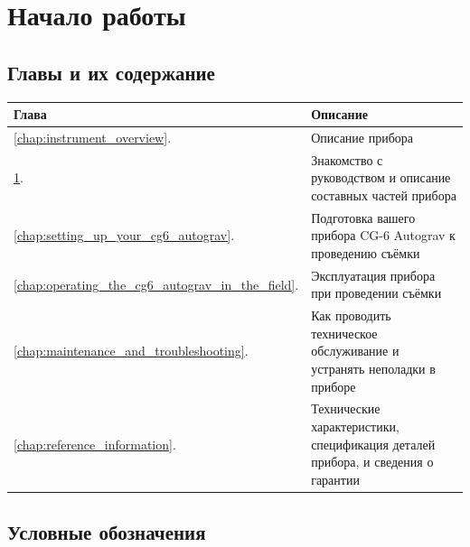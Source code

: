 \chapter[Начало работы]{Начало работы}
\label{chap:getting_started}

\section{Главы и их содержание}

\begin{table}[h]
  \begin{tabulary}{\textwidth}{|L|L|}
    \hline
    Глава & Описание \\
    \hline
    \ref{chap:instrument_overview}.  & Описание прибора \\
    \hline
    \ref{chap:getting_started}.  & Знакомство с
    руководством и описание составных частей прибора \\
    \hline
    \ref{chap:setting_up_your_cg6_autograv}.
     & Подготовка вашего прибора CG-6
    Autograv\texttrademark{} к проведению съёмки \\
    \hline
    \ref{chap:operating_the_cg6_autograv_in_the_field}.
     & Эксплуатация
    прибора \cg{} при проведении съёмки \\
    \hline
    \ref{chap:maintenance_and_troubleshooting}.
    & Как проводить техническое
    обслуживание и устранять неполадки в приборе \cg{} \\
    \hline
    \ref{chap:reference_information}.  &
    Технические характеристики, спецификация деталей прибора, и сведения о
    гарантии \\
    \hline
  \end{tabulary}
\end{table}

\section{Условные обозначения}



